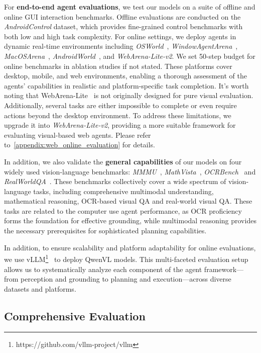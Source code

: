 \documentclass{article} %
\begin{document}
For \textbf{end-to-end agent evaluations}, we test our models on a suite of offline and online GUI interaction benchmarks. Offline evaluations are conducted on the \textit{AndroidControl} dataset, which provides fine-grained control benchmarks with both low and high task complexity. For online settings, we deploy agents in dynamic real-time environments including \textit{OSWorld}~\citep{xie2024osworld}, \textit{WindowAgentArena}~\citep{bonatti2024windows}, \textit{MacOSArena}~\citep{wang2025mmbenchgui}, \textit{AndroidWorld}~\citep{rawles2024androidworld}, and \textit{WebArena-Lite-v2}. We set 50-step budget for online benchmarks in ablation studies if not stated. 
These platforms cover desktop, mobile, and web environments, enabling a thorough assessment of the agents’ capabilities in realistic and platform-specific task completion.
It's worth noting that WebArena-Lite~\citep{liu2024visualagentbench} is not originally designed for pure visual evaluation. Additionally, several tasks are either impossible to complete or even require actions beyond the desktop environment. To address these limitations, we upgrade it into \textit{WebArena-Lite-v2}, providing a more suitable framework for evaluating visual-based web agents. Please refer to~\ref{appendix:web_online_evaluation} for details.

In addition, we also validate the \textbf{general capabilities} of our models on four widely used vision-language benchmarks: \textit{MMMU}~\citep{yue2024mmmu}, \textit{MathVista}~\citep{lu2023mathvista}, \textit{OCRBench}~\citep{liu2024ocrbench} and \textit{RealWorldQA}~\citep{xai-grok15v-2024}. These benchmarks collectively cover a wide spectrum of vision-language tasks, including comprehensive multimodal understanding, mathematical reasoning, OCR-based visual QA and real-world visual QA. 
These tasks are related to the computer use agent performance, as OCR proficiency forms the foundation for effective grounding, while multimodal reasoning provides the necessary prerequisites for sophisticated planning capabilities. 

In addition, to ensure scalability and platform adaptability for online evaluations, we use vLLM\footnote{https://github.com/vllm-project/vllm}~\citep{kwon2023efficient} to deploy QwenVL models. 
This multi-faceted evaluation setup allows us to systematically analyze each component of the agent framework—from perception and grounding to planning and execution—across diverse datasets and platforms.

\subsection{Comprehensive Evaluation}
\end{document}
